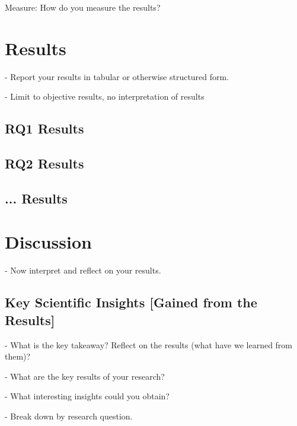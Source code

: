 \documentclass[sigconf, review, nonacm]{acmart}
\begin{document}
Measure: How do you measure the results?


\section{Results}
\label{sec:results}

- Report your results in tabular or otherwise structured form.

- Limit to objective results, no interpretation of results

\subsection{RQ1 Results}
\label{sec:results-rq1}

\subsection{RQ2 Results}
\label{sec:results-rq2}

\subsection{... Results}
\label{sec:results-rq...}


\section{Discussion}
\label{sec:discussion}

- Now interpret and reflect on your results.

\subsection{Key Scientific Insights [Gained from the Results]}
\label{sec:keyresults}

- What is the key takeaway? Reflect on the results (what have we learned from them)?

- What are the key results of your research?

- What interesting insights could you obtain?

- Break down by research question.
\end{document}
